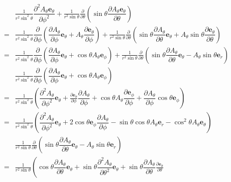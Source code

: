 \begin{align*}
&\frac{1}{r^2\sin^2\theta}\dfrac{{\partial^2 A_\theta\boldsymbol{e}_\theta}}{\partial \phi^2}
+\frac{1}{r^2\sin\theta}\frac{\partial}{\partial \theta}\left(\sin\theta\dfrac{{\partial A_\theta\boldsymbol{e}_\theta}}{\partial \theta}\right)\nonumber\\
=&\frac{1}{r^2\sin^2\theta}\dfrac{\partial}{\partial \phi}\left(\dfrac{\partial A_\theta}{\partial \phi}\boldsymbol{e}_\theta
+A_\theta\dfrac{\partial \boldsymbol{e}_\theta}{\partial \phi}\right)
+\frac{1}{r^2\sin\theta}\frac{\partial}{\partial \theta}\left(\sin\theta\dfrac{{\partial A_\theta}}{\partial \theta}\boldsymbol{e}_\theta
+A_\theta\sin\theta\dfrac{{\partial \boldsymbol{e}_\theta}}{\partial \theta}\right)\nonumber\\
=&\frac{1}{r^2\sin^2\theta}\dfrac{\partial}{\partial \phi}\left(\dfrac{\partial A_\theta}{\partial \phi}\boldsymbol{e}_\theta
+\cos\theta A_\theta\boldsymbol{e}_\phi\right)
+\frac{1}{r^2\sin\theta}\frac{\partial}{\partial \theta}\left(\sin\theta\dfrac{{\partial A_\theta}}{\partial \theta}\boldsymbol{e}_\theta
-A_\theta\sin\theta\boldsymbol{e}_r\right)\\
&\frac{1}{r^2\sin^2\theta}\dfrac{\partial}{\partial \phi}\left(\dfrac{\partial A_\theta}{\partial \phi}\boldsymbol{e}_\theta
+\cos\theta A_\theta\boldsymbol{e}_\phi\right)\\
=&\frac{1}{r^2\sin^2\theta}\left(\dfrac{\partial^2 A_\theta}{\partial \phi^2}\boldsymbol{e}_\theta
+\frac{\partial\boldsymbol{e}_\theta}{\partial \phi}\dfrac{\partial A_\theta}{\partial \phi}
+\cos\theta A_\theta\dfrac{\partial\boldsymbol{e}_\phi}{\partial \phi}
+\dfrac{\partial A_\theta}{\partial \phi}\cos\theta \boldsymbol{e}_\phi\right)\\
=&\frac{1}{r^2\sin^2\theta}\left(\dfrac{\partial^2 A_\theta}{\partial \phi^2}\boldsymbol{e}_\theta
+2\cos\theta\boldsymbol{e}_\phi\dfrac{\partial A_\theta}{\partial \phi}
-\sin\theta\cos\theta A_\theta\boldsymbol{e}_r
-\cos^2\theta A_\theta\boldsymbol{e}_\theta\right)\\
&\frac{1}{r^2\sin\theta}\frac{\partial}{\partial \theta}\left(\sin\theta\dfrac{{\partial A_\theta}}{\partial \theta}\boldsymbol{e}_\theta
-A_\theta\sin\theta\boldsymbol{e}_r\right)\\
=&\frac{1}{r^2\sin\theta}\left(\cos\theta\dfrac{{\partial A_\theta}}{\partial \theta}\boldsymbol{e}_\theta
+\sin\theta\dfrac{{\partial^2 A_\theta}}{\partial \theta^2}\boldsymbol{e}_\theta
+\sin\theta\dfrac{{\partial A_\theta}}{\partial \theta}\frac{\partial\boldsymbol{e}_\theta}{\partial \theta}

\end{align*}
